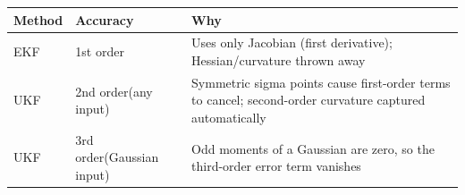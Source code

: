 \documentclass[12pt, a4paper]{article}
\begin{document}
\begin{notebox}
  \begin{center}
  \renewcommand{\arraystretch}{1.4}
  \begin{tabular}{p{2.2cm} p{2.5cm} p{7.5cm}}
    \toprule
    \textbf{Method} & \textbf{Accuracy} & \textbf{Why} \\
    \midrule
    EKF &
      1st order &
      Uses only Jacobian (first derivative); Hessian/curvature
      thrown away \\
    UKF &
      2nd order\newline(any input) &
      Symmetric sigma points cause first-order terms to cancel;
      second-order curvature captured automatically \\
    UKF &
      3rd order\newline(Gaussian input) &
      Odd moments of a Gaussian are zero, so the third-order
      error term vanishes \\
    \bottomrule
  \end{tabular}
  \end{center}
\end{notebox}
\end{document}
